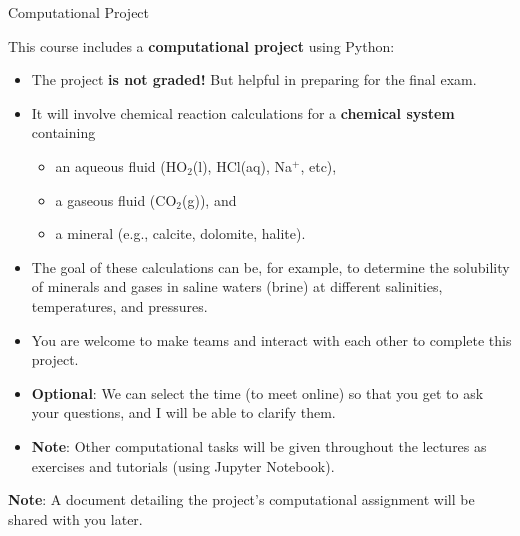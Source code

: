 \begin{frame}{Computational Project}
\small

This course includes a \alert{\textbf{computational project}} using Python:
%
\begin{itemize}
\item The project \textbf{is not graded!} But helpful in preparing for the final exam.
\pause
\item It will involve chemical reaction calculations for a \textbf{chemical system} containing 
\begin{itemize}
\item an aqueous fluid (HO$_2$(l), HCl(aq), Na$^+$, etc), 
\item a gaseous fluid (CO$_{2}$(g)), and 
\item a mineral (e.g., calcite, dolomite, halite). 
\end{itemize}
\pause
\item The goal of these calculations can be, for example, to determine the solubility
of minerals and gases in saline waters (brine) at different salinities,
temperatures, and pressures. 
\pause
\item You are welcome to make teams and interact with each other to complete this project. 
\pause
\item \textbf{Optional}: We can select the time (to meet online) so that you get to ask your questions, 
and I will be able to clarify them. 
\pause
\item \textbf{Note}: Other computational tasks will be given throughout the lectures as exercises and tutorials 
(using Jupyter Notebook).
\end{itemize}
%
\alert{\textbf{Note}}: A document detailing the project's computational assignment will be shared with you later.
\end{frame}

